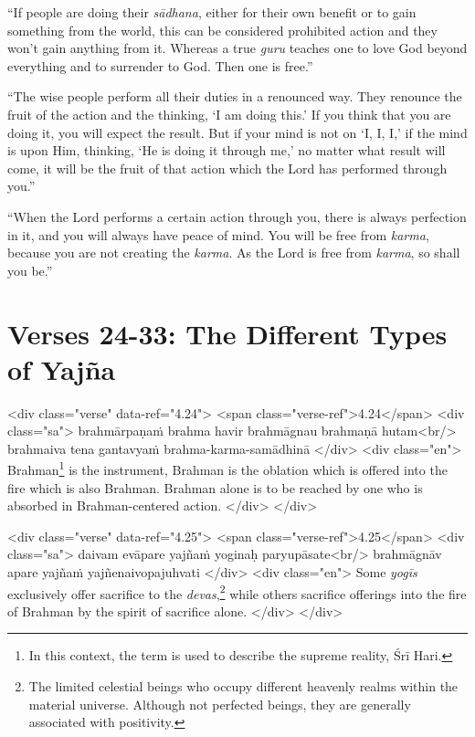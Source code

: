 \enquote{If people are doing their \textit{sādhana}, either for their own benefit or to gain something from the world, this can be considered prohibited action and they won’t gain anything from it. Whereas a true \textit{guru} teaches one to love God beyond everything and to surrender to God. Then one is free.}

\enquote{The wise people perform all their duties in a renounced way. They renounce the fruit of the action and the thinking, \enquote{I am doing this.} If you think that you are doing it, you will expect the result. But if your mind is not on \enquote{I, I, I,} if the mind is upon Him, thinking, \enquote{He is doing it through me,} no matter what result will come, it will be the fruit of that action which the Lord has performed through you.}

\enquote{When the Lord performs a certain action through you, there is always perfection in it, and you will always have peace of mind. You will be free from \textit{karma}, because you are not creating the \textit{karma}. As the Lord is free from \textit{karma}, so shall you be.}

\newpage
\section{Verses 24-33: The Different Types of Yajña}\label{sec-verses-24-33-the-different-types-of-yajna}


\begin{html}
<div class="verse" data-ref="4.24">
  <span class="verse-ref">4.24</span>
  <div class="sa">
    brahmārpaṇaṁ brahma havir brahmāgnau brahmaṇā hutam<br/>
    brahmaiva tena gantavyaṁ brahma-karma-samādhinā
  </div>
  <div class="en">
    Brahman\footnote{In this context, the term is used to describe the supreme reality, Śrī Hari.} is the instrument, Brahman is the oblation which is offered into the fire which is also Brahman. Brahman alone is to be reached by one who is absorbed in Brahman-centered action.
  </div>
</div>
\end{html}



\begin{html}
<div class="verse" data-ref="4.25">
  <span class="verse-ref">4.25</span>
  <div class="sa">
    daivam evāpare yajñaṁ yoginaḥ paryupāsate<br/>
    brahmāgnāv apare yajñaṁ yajñenaivopajuhvati
  </div>
  <div class="en">
    Some \textit{yogīs} exclusively offer sacrifice to the \textit{devas},\footnote{The limited celestial beings who occupy different heavenly realms within the material universe. Although not perfected beings, they are generally associated with positivity.} while others sacrifice offerings into the fire of Brahman by the spirit of sacrifice alone.
  </div>
</div>
\end{html}



